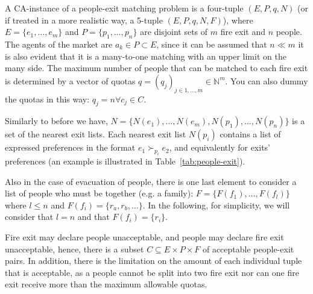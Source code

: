 \documentclass[letterpaper]{article} %
\begin{document}
    A CA-instance of a people-exit matching problem is a four-tuple \((E, P, q, N)\)
    (or if treated in a more realistic way, a 5-tuple \((E, P, q, N, F)\)), where
    \(E = \{e_1, \dots, e_m\}\) and \(P = \{p_1, \dots,p_n\}\) are disjoint sets of \(m\) fire exit and \(n\) people.
    The agents of the market are \(a_k \in P\subset E\), since it can be assumed that \(n \ll m\) it is also evident
    that it is a many-to-one matching with an upper limit  on the many side.
    The maximum number of people that can be matched to
    each fire exit is determined by a vector of quotas \(q = (q_j)_{j\in {1,...,m}} \in \mathbb{N}^m\).
    You can also dummy the quotas in this way:  \(q_j = n \forall c_j \in C\).

    Similarly to before we have, \(N = \{N(e_1), \dots , N(e_m), N(p_1), \dots , N(p_n)\}\) is
    a set of the nearest exit lists.
    Each nearest exit list \(N(p_i)\) contains a list of expressed preferences in the format
    \( e _ { 1 } \succ_{p _ { i }} e _ { 2 } \), and equivalently for exits' preferences (an example is illustrated in Table~\ref{tab:people-exit}).

    Also in the case of evacuation of people, there is one last element to consider a list of people who must be together (e.g. a family):
    \(F=\{F(f_1), \dots, F(f_l)\}\) where \(l\leq n\) and \(F(f_i) = \{r_a, r_b, \dots\}\).
    In the following, for simplicity, we will consider that \(l=n\) and that \(F(f_i)=\{r_i\}\).

    Fire exit may declare people unacceptable, and people may declare fire exit unacceptable,
    hence, there is a subset \(C \subseteq E \times P \times F\) of acceptable people-exit pairs.
    In addition, there is the limitation on the amount of each individual tuple that is acceptable, as a people
    cannot be split into two fire exit nor can one fire exit receive more than the maximum allowable quotas.
\end{document}
